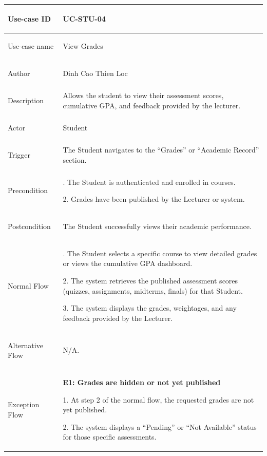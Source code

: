 {
\renewcommand{\arraystretch}{1.1}
\setlength{\tabcolsep}{8pt}
\begin{longtable}{|>{\bfseries\raggedright\arraybackslash}p{}|>{\raggedright\arraybackslash}p{}|}
\hline
Use-case ID & UC-STU-04 \\ \hline
Use-case name & View Grades \\ \hline
Author & Dinh Cao Thien Loc \\ \hline
Description & Allows the student to view their assessment scores, cumulative GPA, and feedback provided by the lecturer. \\ \hline
Actor & Student \\ \hline
Trigger & The Student navigates to the ``Grades'' or ``Academic Record'' section. \\ \hline
Precondition &
1. The Student is authenticated and enrolled in courses. \par
2. Grades have been published by the Lecturer or system. \\ \hline
Postcondition & The Student successfully views their academic performance. \\ \hline
Normal Flow &
1. The Student selects a specific course to view detailed grades or views the cumulative GPA dashboard. \par
2. The system retrieves the published assessment scores (quizzes, assignments, midterms, finals) for that Student. \par
3. The system displays the grades, weightages, and any feedback provided by the Lecturer. \\ \hline
Alternative Flow & N/A. \\ \hline
Exception Flow &
\textbf{E1: Grades are hidden or not yet published} \par
1. At step 2 of the normal flow, the requested grades are not yet published. \par
2. The system displays a ``Pending'' or ``Not Available'' status for those specific assessments. \\ \hline
\end{longtable}
}

